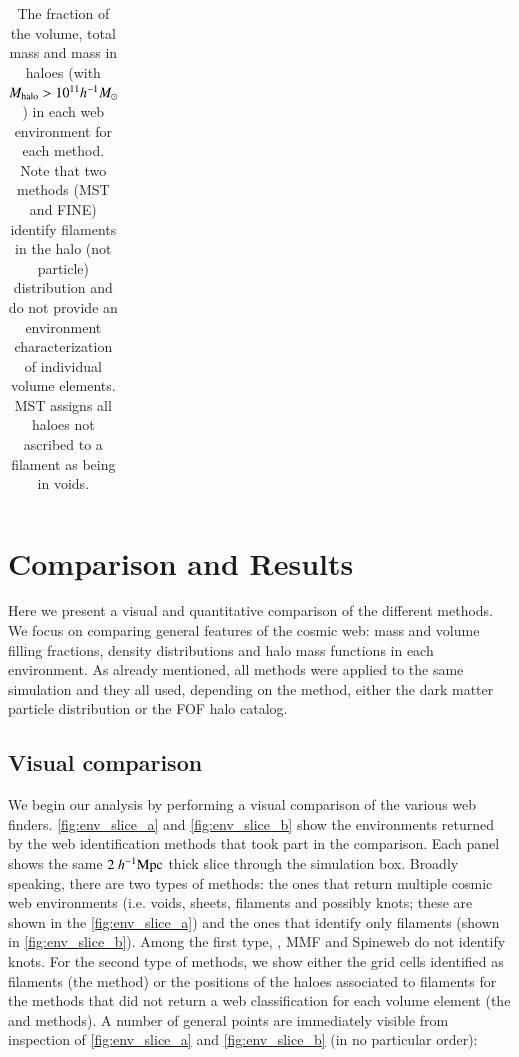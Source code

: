 \begin{center}
\begin{table}
\begin{flushright}
\begin{tabular}{|c|cccc|cccc|cccc|}
 & &&&&&&&&&&&\\
\hline
\end{tabular}
\vskip 0.5cm
\caption{The fraction of the volume, total mass and mass in haloes (with $M_{\rm halo} > 10^{11}h^{-1}M_{\odot}$) in each web environment for each method. Note that two methods (MST and FINE) identify filaments in the halo (not particle) distribution and do not provide an environment characterization of individual volume elements. MST assigns all haloes not ascribed to a filament as being in voids.}
  \label{tab:mff}
\end{flushright}
\end{table}
\end{center}


\section{Comparison and Results}
\label{sec:results}

Here we present a visual and quantitative comparison of the different methods. We focus on comparing general features of the cosmic web: mass and volume filling fractions, density distributions and halo mass functions in each environment. As already mentioned, all methods were applied to the same simulation and they all used, depending on the method, either the dark matter particle distribution or the FOF halo catalog.

\subsection{Visual comparison}
\label{sec:cube}
We begin our analysis by performing a visual comparison of the various web finders. \autoref{fig:env_slice_a} and \autoref{fig:env_slice_b} show the environments returned by the web identification methods that took part in the comparison. Each panel shows the same $2~h^{-1}\rm Mpc$ thick slice through the simulation box. Broadly speaking, there are two types of methods: the ones that return multiple cosmic web environments (i.e. voids, sheets, filaments and possibly knots; these are shown in the \autoref{fig:env_slice_a}) and the ones that identify only filaments (shown in \autoref{fig:env_slice_b}). Among the first type, \disperse{}, MMF and Spineweb do not identify knots. For the second type of methods, we show either the grid cells identified as filaments (the \bisous{} method) or the positions of the haloes associated to filaments for the methods that did not return a web classification for each volume element (the \fine{} and \mst{} methods). A number of general points are immediately visible from inspection of \autoref{fig:env_slice_a} and \autoref{fig:env_slice_b} (in no particular order):


